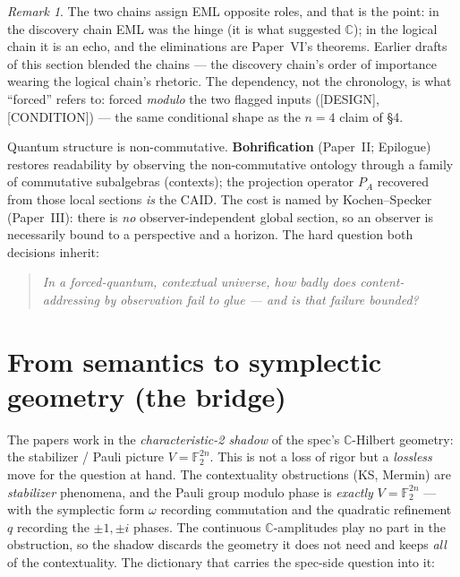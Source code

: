 \documentclass[11pt,a4paper]{article}
\newcommand{\F}{\mathbb{F}}
\newcommand{\C}{\mathbb{C}}
\theoremstyle{plain}
\theoremstyle{definition}
\theoremstyle{remark}
\newtheorem*{remark}{Remark}
\begin{document}
\begin{remark}
The two chains assign EML opposite roles, and that is the point: in the
discovery chain EML was the hinge (it is what suggested $\C$); in the logical
chain it is an echo, and the eliminations are Paper~VI's theorems. Earlier
drafts of this section blended the chains --- the discovery chain's order of
importance wearing the logical chain's rhetoric. The dependency, not the
chronology, is what ``forced'' refers to: forced \emph{modulo} the two flagged
inputs ([DESIGN], [CONDITION]) --- the same conditional shape as the $n=4$
claim of \S4.
\end{remark}
Quantum structure is non-commutative. \textbf{Bohrification} (Paper~II; Epilogue)
restores readability by observing the non-commutative ontology through a family
of commutative subalgebras (contexts); the projection operator $P_A$ recovered
from those local sections \emph{is} the CAID. The cost is named by
Kochen--Specker (Paper~III): there is \emph{no} observer-independent global
section, so an observer is necessarily bound to a perspective and a horizon. The
hard question both decisions inherit:

\begin{quote}
\emph{In a forced-quantum, contextual universe, how badly does content-addressing
by observation fail to glue --- and is that failure bounded?}
\end{quote}

\section{From semantics to symplectic geometry (the bridge)}

The papers work in the \emph{characteristic-2 shadow} of the spec's $\C$-Hilbert
geometry: the stabilizer / Pauli picture $V=\F_2^{2n}$. This is not a loss of rigor
but a \emph{lossless} move for the question at hand. The contextuality obstructions
(KS, Mermin) are \emph{stabilizer} phenomena, and the Pauli group modulo phase is
\emph{exactly} $V=\F_2^{2n}$ --- with the symplectic form $\omega$ recording
commutation and the quadratic refinement $q$ recording the $\pm1,\pm i$ phases. The
continuous $\C$-amplitudes play no part in the obstruction, so the shadow discards
the geometry it does not need and keeps \emph{all} of the contextuality. The
dictionary that carries the spec-side question into it:
\end{document}
